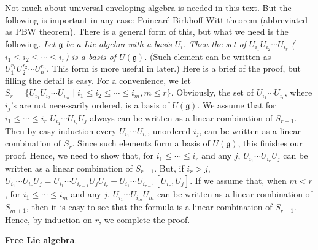 \documentclass{article}
\newcommand{\SBar}{\;|\;}
\newcommand{\lie}[1]{\mathfrak{#1}}
\begin{document}
Not much about universal enveloping algebra is needed in this text.
But the following is important in any case: Poincar\'e-Birkhoff-Witt theorem (abbreviated as PBW theorem).
There is a general form of this, but what we need is the following.
\textit{Let $\lie{g}$ be a Lie algebra with a basis $U_i$.
Then the set of $U_{i_1} U_{i_2} \cdots U_{i_r}$ ($i_1 \le i_2 \le \cdots \le i_r$) is a basis of $U(\lie{g})$.}
(Such element can be written as $U_1^{r_1} U_2^{r_2} \cdots U_n^{r_n}$. This form is more useful in later.)
Here is a brief of the proof, but filling the detail is easy.
For a convenience, we let $S_r = \{U_{i_1} U_{i_2} \cdots U_{i_m} \SBar i_1 \le i_2 \le \cdots \le i_m, m \le r\}$.
Obviously, the set of $U_{i_1} \cdots U_{i_r}$, where $i_j$'s are not necessarily ordered, is a basis of $U(\lie{g})$.
We assume that for $i_1 \le \cdots \le i_r$ $U_{i_1} \cdots U_{i_r} U_j$ always can be written as a linear combination of $S_{r + 1}$.
Then by easy induction every $U_{i_1} \cdots U_{i_r}$, unordered $i_j$, can be written as a linear combination of $S_r$.
Since such elements form a basis of $U(\lie{g})$, this finishes our proof.
Hence, we need to show that, for $i_1 \le \cdots \le i_r$ and any $j$, $U_{i_1} \cdots U_{i_r} U_j$ can be written as a linear combination of $S_{r + 1}$.
But, if $i_r > j$, $U_{i_1} \cdots U_{i_r} U_j = U_{i_1} \cdots U_{i_{r - 1}} U_j U_{i_r} + U_{i_1} \cdots U_{i_{r - 1}} [U_{i_r}, U_j]$.
If we assume that, when $m < r$, for $i_1 \le \cdots \le i_m$ and any $j$, $U_{i_1} \cdots U_{i_m} U_m$ can be written as a linear combination of $S_{m + 1}$, then it is easy to see that the formula is a linear combination of $S_{r + 1}$.
Hence, by induction on $r$, we complete the proof.

\newpage

\textbf{Free Lie algebra}.
\end{document}
